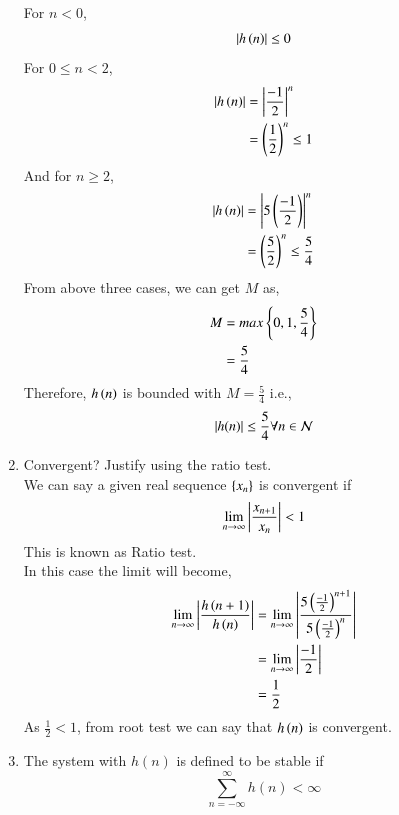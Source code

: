 \documentclass[journal,12pt,twocolumn]{IEEEtran}
\renewcommand\thesection{\arabic{section}}
\begin{document}
\begin{enumerate}[label=\thesection.\arabic*]
    For $n < 0$, 
       \begin{align}
    \left\vert h\left(n\right)\right\vert \leq 0 
       \end{align}
    For $0 \leq n <2$,
       \begin{align}
        \left\vert h\left(n\right)\right\vert &= \left\vert\frac{-1}{2}\right\vert^{n}\\
                        &= \left(\frac{1}{2}\right)^{n} \leq 1
       \end{align}
    And for $n \geq 2$,
       \begin{align}
        \left\vert h\left(n\right)\right\vert &= \left\vert5\left(\frac{-1}{2}\right)\right\vert^{n}\\
                        &= \left(\frac{5}{2}\right)^{n} \leq \frac{5}{4}
       \end{align}
    From above three cases, we can get $M$ as,
      \begin{align}
        M &= max\left\{0,1,\frac{5}{4}\right\} \\
          &= \frac{5}{4}
      \end{align}
    Therefore, $h\left(n\right)$ is bounded  with $M = \frac{5}{4}$ i.e.,
    \begin{align} 
      \left\vert h(n)\right\vert \leq \frac{5}{4}  \forall n \in \mathcal{N}
    \end{align}    
     \item Convergent? Justify using the ratio test.\\
     \solution We can say a given real sequence $\left\{x_n\right\}$ is convergent if 
       \begin{align}
         \lim_{n \rightarrow \infty}\left\vert\frac{x_{n+1}}{x_n}\right\vert < 1
       \end{align}
        This is known as Ratio test.\\
      In this case the limit will become,
       \begin{align}
         \lim_{n \rightarrow \infty}\left\vert\frac{h\left(n+1\right)}{h\left(n\right)}\right\vert &= \lim_{n \rightarrow \infty}\left\vert\frac{5\left(\frac{-1}{2}\right)^{n+1}}{5\left(\frac{-1}{2}\right)^{n}}\right\vert \\
          &= \lim_{n \rightarrow \infty}\left\vert\frac{-1}{2}\right\vert\\
          &= \frac{1}{2}
       \end{align}
      As $\frac{1}{2} < 1$, from root test we can say that $h\left(n\right)$ is convergent.
       \item The system with $h(n)$ is defined to be stable if
     \begin{equation}
      \sum_{n=-\infty}^{\infty}h(n) < \infty
     \end{equation}

\end{enumerate}
\end{document}
